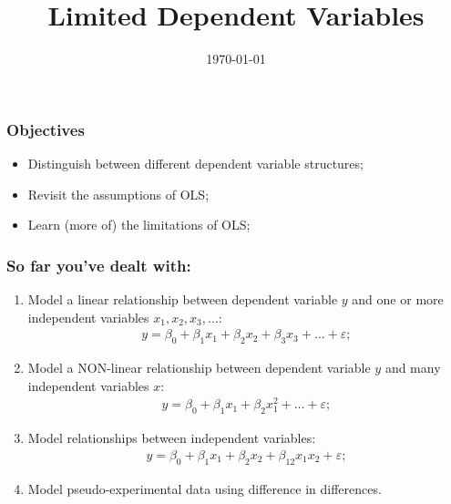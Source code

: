 \documentclass[aspectratio=169]{beamer}
\title{Limited Dependent Variables}
\date{\today}
\begin{document}
{
\begin{frame}
    \maketitle
\end{frame}
}


\begin{frame}
\frametitle{Objectives}
\begin{itemize}
\item Distinguish between different dependent variable structures;
\bigskip
\bigskip
\item Revisit the assumptions of OLS;
\bigskip
\bigskip
\item Learn (more of) the limitations of OLS;
\end{itemize}
\end{frame}


\begin{frame}
\frametitle{So far you've dealt with:}
\begin{enumerate} 

\item Model a linear relationship between dependent variable $y$ and one or more independent variables $x_1,x_2,x_3,\hdots$:
\begin{align*}
y = \beta_0 + \beta_1x_1 + \beta_2x_2 + \beta_3x_3 + \hdots + \varepsilon;
\end{align*}

\item Model a NON-linear relationship between dependent variable $y$ and many independent variables $x$:
\begin{align*}
y = \beta_0 + \beta_1x_1 + \beta_2x_1^2 + \hdots + \varepsilon;
\end{align*}

\item Model relationships between independent variables:
\begin{align*}
y = \beta_0 + \beta_1x_1 + \beta_2x_2 + \beta_{12}x_1x_2 + \varepsilon;
\end{align*}

\item Model pseudo-experimental data using difference in differences.

\end{enumerate}
\end{frame}
\end{document}

